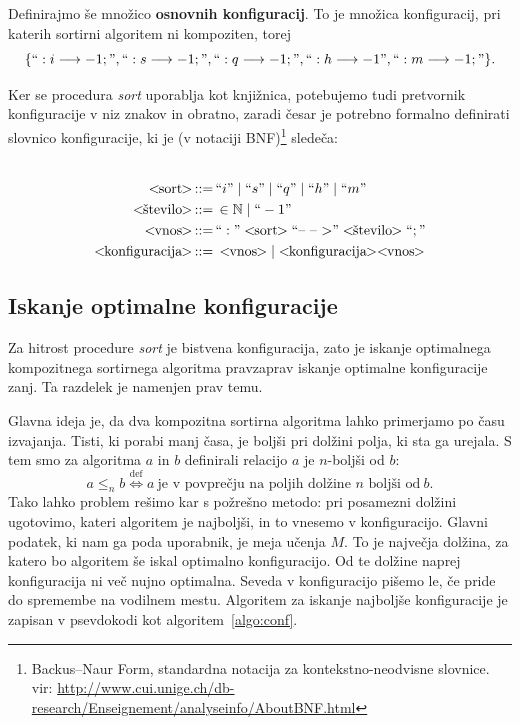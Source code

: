 \documentclass[a4paper,oneside,12pt]{article}
\def\N{\mathbb N}
\def\ali{\;|\;}
\newenvironment{BNF}{
    \\
    \Sbox
    \minipage{12cm}
}{
    \endminipage
    \endSbox
    \minipage{\textwidth}
    \vspace*{5pt}
    \begin{center}
        \fcolorbox{white}{white}{
            \TheSbox
        }
    \end{center}
    \vspace*{5pt}
    \endminipage
}
\def\bnfassign:{\,::=&\,}
\newcommand{\q}[1]{\text{``}#1\text{''}}
\newcommand{\ntm}[1]{\ensuremath{<\!\!\text{#1}\!\!>}}
\newcommand{\abnf}[2]{\ensuremath{\ntm{#1} \bnfassign: #2}}
\newcommand{\lra}{\ensuremath{\longrightarrow}}
\begin{document}

Definirajmo še množico \textbf{osnovnih konfiguracij}. To je množica konfiguracij, pri katerih
sortirni algoritem ni kompoziten, torej 
\[ \{``:i \lra -1;", ``:s \lra -1;", 
``:q \lra -1;", ``:h \lra -1", ``:m \lra -1;"\}. \]

\pagebreak
Ker se procedura \emph{sort} uporablja kot knjižnica, potebujemo tudi pretvornik
konfiguracije v niz znakov in obratno, zaradi česar je potrebno formalno definirati slovnico
konfiguracije, ki je (v notaciji BNF)\footnote{
Backus--Naur Form, standardna notacija za kontekstno-neodvisne slovnice.\\
vir: \url{http://www.cui.unige.ch/db-research/Enseignement/analyseinfo/AboutBNF.html}} 
sledeča:
\\
\begin{BNF}
  \begin{align*}
    \abnf{sort}{\q{i} \ali \q{s} \ali \q{q} \ali \q{h} \ali \q{m}}\\
    \abnf{število}{\in \N \ali \q{-1}} \\
    \abnf{vnos}{\q{:}\ntm{sort}\q{\mbox{--}\ \mbox{--}\ \mbox{$>$}}\ntm{število}\q{;}}\\
    \abnf{konfiguracija}{\ntm{vnos} | \ntm{konfiguracija}\ntm{vnos}}
  \end{align*}
\end{BNF}

\subsection{Iskanje optimalne konfiguracije}
\label{chapter:optimalconf}
Za hitrost procedure \emph{sort} je bistvena konfiguracija,
zato je iskanje optimalnega kompozitnega sortirnega algoritma pravzaprav iskanje optimalne
konfiguracije zanj. Ta razdelek je namenjen prav temu.  

Glavna ideja je, da dva kompozitna sortirna algoritma lahko primerjamo po času 
izvajanja. Tisti, ki porabi manj časa, je boljši pri dolžini polja, ki sta
ga urejala. S tem smo za algoritma $a$ in $b$ definirali relacijo $a$ je $n$-boljši od $b$:
\[ a \leq_n b \overset{\text{def}}{\Longleftrightarrow} a\ \text{je v povprečju na poljih dolžine $n$ boljši
od}\ b.\]
Tako lahko problem rešimo kar s požrešno metodo: 
pri posamezni dolžini ugotovimo, kateri algoritem je najboljši, in to vnesemo
v konfiguracijo. Glavni podatek, ki nam ga poda uporabnik, je meja učenja $M$. To je
največja dolžina, za katero bo algoritem še iskal optimalno konfiguracijo. Od te dolžine naprej
konfiguracija ni več nujno optimalna. Seveda v konfiguracijo pišemo le, če pride do 
spremembe na vodilnem mestu. Algoritem za iskanje najboljše konfiguracije je zapisan v
psevdokodi kot algoritem~\ref{algo:conf}.
\end{document}

